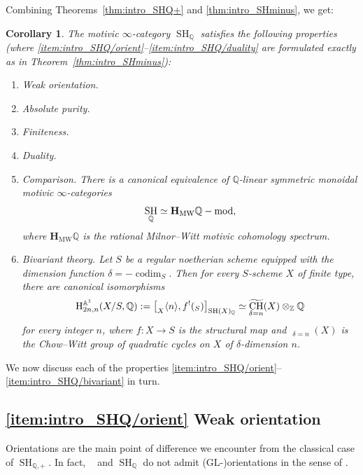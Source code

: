 \documentclass[11pt]{article}
\makeatletter
\numberwithin{equation}{section}\renewcommand{\encodingdefault}{TU}
\DeclareRobustCommand{\mathbbm}[1]{\csname jepbb@#1\endcsname}
\newcommand{\modl}[1]{#1\textnormal{-}\mathrm{mod}}
\renewcommand{\AA}{\mathbb A}
\newcommand{\un}{\mathbbm 1}
\newcommand{\HMW}{\mathbf H_{\mathrm{MW}}}
\newcommand{\BA}{\mathrm H^{\AA^1}}
\newcommand{\GL}{\mathrm{GL}}
\DeclareMathOperator{\codim}{codim}
\DeclareMathOperator{\SH}{SH}
\DeclareMathOperator{\DAminus}{D_{\AA^1,-}}
\DeclareMathOperator{\wCH}{\widetilde{CH}}
\newcommand{\twist}[1]{\langle #1 \rangle}
\newcommand{\ZZ} {\mathbb Z}
\newcommand{\QQ} {\mathbb Q}
\newtheorem{cori}[thmi]{Corollary}
\theoremstyle{remark}
\theoremstyle{definition}
\numberwithin{equation}{thm}
\makeatother
\begin{document}
Combining Theorems~\ref{thm:intro_SHQ+} and \ref{thm:intro_SHminus}, we get:

\begin{cori}\label{cor:intro_SHQ}
The motivic $\infty$-category $\SH_{\QQ}$ satisfies the following properties (where \eqref{item:intro_SHQ/orient}--\eqref{item:intro_SHQ/duality} are formulated exactly as in Theorem~\ref{thm:intro_SHminus}):

\begin{enumerate}\renewcommand{\theenumi}{\Roman{enumi}}
\item\emph{Weak orientation.}\label{item:intro_SHQ/orient}
\item\emph{Absolute purity.}\label{item:intro_SHQ/purity}
\item\emph{Finiteness.}\label{item:intro_SHQ/finiteness}
\item\emph{Duality.}\label{item:intro_SHQ/duality}
\item\emph{Comparison.}\label{item:intro_SHQ/comparison}
There is a canonical equivalence of $\QQ$-linear symmetric monoidal motivic $\infty$-categories
\[
\SH_{\QQ} \simeq \modl{\HMW\QQ},
\]
where $\HMW\QQ$ is the rational Milnor--Witt motivic cohomology spectrum.
\item\emph{Bivariant theory.}\label{item:intro_SHQ/bivariant}
Let $S$ be a regular noetherian scheme equipped with the dimension function $\delta=-\codim_S$.
Then for every $S$-scheme $X$ of finite type, there are canonical isomorphisms
\[
\BA_{2n,n}(X/S, \QQ)
:= \big[ \un_X\twist{n}, f^!(\un_S) \big]_{\SH(X)_\QQ}
\simeq \wCH_{\delta=n}(X) \otimes_\ZZ \QQ
\]
for every integer $n$, where $f : X \to S$ is the structural map and $\wCH_{\delta=n}(X)$ is the Chow--Witt group of quadratic cycles on $X$ of $\delta$-dimension $n$.
\end{enumerate}
\end{cori}

We now discuss each of the properties \eqref{item:intro_SHQ/orient}--\eqref{item:intro_SHQ/bivariant} in turn.

\subsection*{\eqref{item:intro_SHQ/orient} Weak orientation}

Orientations are the main point of difference we encounter from the classical case of $\SH_{\QQ,+}$.
In fact, $\DAminus$ and $\SH_\QQ$ do not admit ($\GL$-)orientations in the sense of \cite[Def.\,2.4.38]{CD3}.
\end{document}

